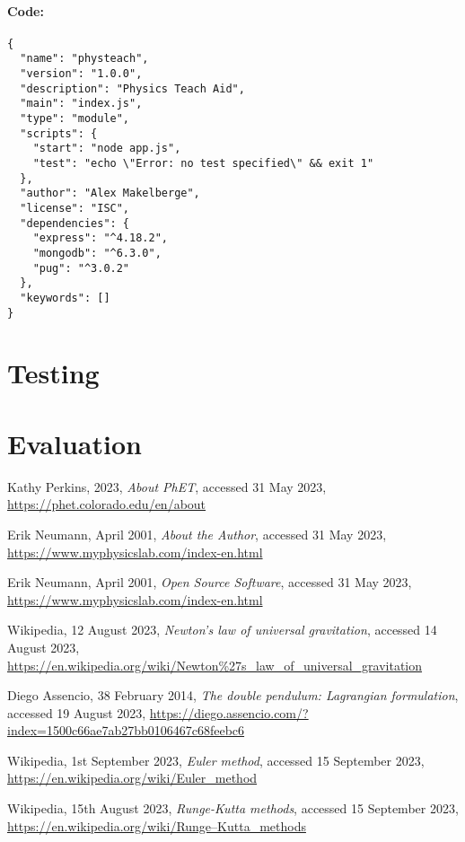 \documentclass[12pt]{article}
\begin{document}
\paragraph{Code:}
\begin{lstlisting}
{
  "name": "physteach",
  "version": "1.0.0",
  "description": "Physics Teach Aid",
  "main": "index.js",
  "type": "module",
  "scripts": {
    "start": "node app.js",
    "test": "echo \"Error: no test specified\" && exit 1"
  },
  "author": "Alex Makelberge",
  "license": "ISC",
  "dependencies": {
    "express": "^4.18.2",
    "mongodb": "^6.3.0",
    "pug": "^3.0.2"
  },
  "keywords": []
}

\end{lstlisting}













\newpage
\section{Testing}

\newpage
\section{Evaluation}

\newpage
\begin{thebibliography}{999}
  Kathy Perkins,
  2023,
  \emph{About PhET},
  accessed 31 May 2023,
  \url{https://phet.colorado.edu/en/about}
  
  Erik Neumann,
  April 2001,
  \emph{About the Author},
  accessed 31 May 2023,
  \url{https://www.myphysicslab.com/index-en.html}

  Erik Neumann,
  April 2001,
  \emph{Open Source Software},
  accessed 31 May 2023,
  \url{https://www.myphysicslab.com/index-en.html}

  Wikipedia,
  12 August 2023,
  \emph{Newton's law of universal gravitation},
  accessed 14 August 2023,
  \url{https://en.wikipedia.org/wiki/Newton%27s_law_of_universal_gravitation}

  Diego Assencio,
  38 February 2014,
  \emph{The double pendulum: Lagrangian formulation},
  accessed 19 August 2023,
  \url{https://diego.assencio.com/?index=1500c66ae7ab27bb0106467c68feebc6} 

    Wikipedia,
    1st September 2023,
    \emph{Euler method},
    accessed 15 September 2023,
    \url{https://en.wikipedia.org/wiki/Euler_method}

    Wikipedia,
    15th August 2023,
    \emph{Runge-Kutta methods},
    accessed 15 September 2023,
    \url{https://en.wikipedia.org/wiki/Runge–Kutta_methods}

\end{thebibliography}
\end{document}
